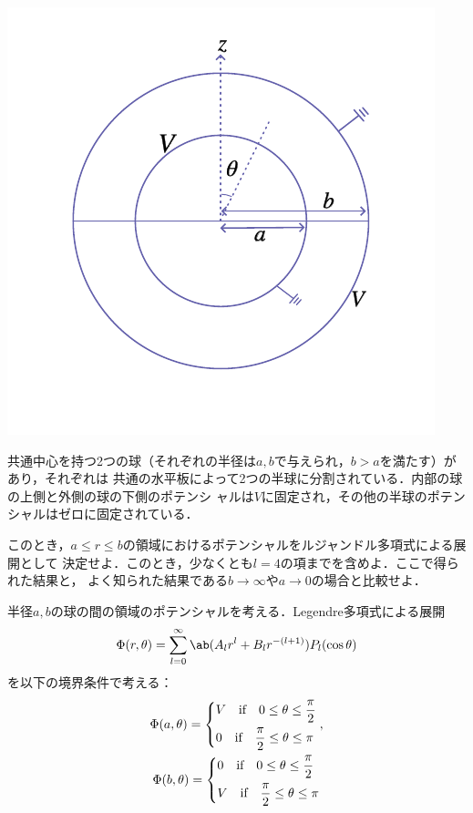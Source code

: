 \begin{bx1}
  \begin{wrapstuff}[type=figure,r,lines=7,width=0.23\linewidth]
    \includegraphics[width=\linewidth]{fig/Jackson3-1.pdf}%
  \end{wrapstuff}
  共通中心を持つ2つの球（それぞれの半径は$a, b$で与えられ，$b>a$を満たす）があり，それぞれは
  共通の水平板によって2つの半球に分割されている．内部の球の上側と外側の球の下側のポテンシ
  ャルは$V$に固定され，その他の半球のポテンシャルはゼロに固定されている．

  このとき，$a \leq r \leq b$の領域におけるポテンシャルをルジャンドル多項式による展開として
  決定せよ．このとき，少なくとも$l = 4$の項までを含めよ．ここで得られた結果と，
  よく知られた結果である$b \to \infty$や$a \to 0$の場合と比較せよ．
\end{bx1}
半径$a, b$の球の間の領域のポテンシャルを考える．Legendre多項式による展開
\begin{gather}%
  \Phi(r, \theta) = \sum_{l=0}^\infty \ab(A_l r^l + B_l r^{-(l+1)}) P_l (\cos\theta)
\end{gather}
を以下の境界条件で考える：
\begin{gather}%
  \label{eq:prob3-1_bc1}
  \Phi(a,\theta) =
  \begin{dcases}%
    V \qqtext{if} 0 \leq \theta \leq \frac{\pi}{2}\\
    0 \qqtext{if} \frac{\pi}{2} \leq \theta \leq \pi
  \end{dcases},\\
  \label{eq:prob3-1_bc2}
  \Phi(b,\theta) =
  \begin{dcases}%
    0 \qqtext{if} 0 \leq \theta \leq \frac{\pi}{2}\\
    V \qqtext{if} \frac{\pi}{2} \leq \theta \leq \pi
  \end{dcases}%
\end{gather}%
